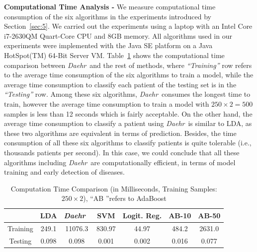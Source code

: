\documentclass[journal,compsoc]{IEEEtran}
\newcommand{\TheName}{\mbox{\emph{Daehr}}}
\begin{document}
\textbf{Computational Time Analysis - } We measure computational time consumption of the six algorithms in the experiments introduced by Section~\ref{sec:5}. We carried out the experiments using a laptop with an Intel Core i7-2630QM Quart-Core CPU and 8GB memory. All algorithms used in our experiments were implemented with the Java SE platform on a Java HotSpot(TM) 64-Bit Server VM.
%
%
Table~\ref{tab:time-consuming} shows the computational time comparison between \TheName\ and the rest of methods, where  \emph{``Training''} row refers to the average time consumption of the six algorithms to train a model, while the average time consumption to classify each patient of the testing set is in the \emph{``Testing''} row. Among these six algorithms, \TheName\ consumes the longest time to train, however the average time consumption to train a model with $250\times 2=500$ samples is less than 12 seconds which is fairly acceptable. On the other hand, the average time consumption to classify a patient using \TheName\ is similar to LDA, as these two algorithms are equivalent in terms of prediction. Besides, the time consumption of all these six algorithms to classify patients is quite tolerable (i.e., thousands patients per second). In this case, we could conclude that all these algorithms including \TheName\ are computationally efficient, in terms of model training and early detection of diseases.

\begin{table}
\centering
\caption{Computation Time Comparison (in Milliseconds, Training Samples: $250\times 2$), ``AB ''refers to AdaBoost}
\footnotesize
\begin{tabular}{|c|c|c|c|c|c|c|}\hline
&LDA&\TheName\ &SVM&Logit. Reg. & AB-10 & AB-50\\\hline

Training  &	249.1	&  11076.3  &  830.97  &  44.97  &  484.2 & 2631.0  \\\hline

Testing   &	0.098	&  0.098   &  0.001    &  0.002  &  0.016 & 0.077  \\\hline

\end{tabular}
\label{tab:time-consuming}
\end{table}
\end{document}
